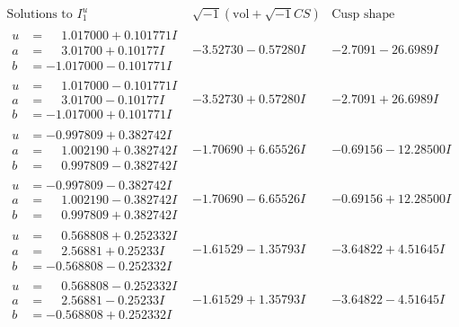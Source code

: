 \documentclass[1p]{elsarticle_modified}
\theoremstyle{definition}
\newcommand{\I}{\sqrt{-1}}
\begin{document}
$$\begin{array}{c|c|c}  
\text{Solutions to }I^u_{1}& \I (\text{vol} + \sqrt{-1}CS) & \text{Cusp shape}\\
 \hline 
\begin{aligned}
u &= \phantom{-}1.017000 + 0.101771 I \\
a &= \phantom{-}3.01700 + 0.10177 I \\
b &= -1.017000 - 0.101771 I\end{aligned}
 & -3.52730 - 0.57280 I & -2.7091 - 26.6989 I \\ \hline\begin{aligned}
u &= \phantom{-}1.017000 - 0.101771 I \\
a &= \phantom{-}3.01700 - 0.10177 I \\
b &= -1.017000 + 0.101771 I\end{aligned}
 & -3.52730 + 0.57280 I & -2.7091 + 26.6989 I \\ \hline\begin{aligned}
u &= -0.997809 + 0.382742 I \\
a &= \phantom{-}1.002190 + 0.382742 I \\
b &= \phantom{-}0.997809 - 0.382742 I\end{aligned}
 & -1.70690 + 6.65526 I & -0.69156 - 12.28500 I \\ \hline\begin{aligned}
u &= -0.997809 - 0.382742 I \\
a &= \phantom{-}1.002190 - 0.382742 I \\
b &= \phantom{-}0.997809 + 0.382742 I\end{aligned}
 & -1.70690 - 6.65526 I & -0.69156 + 12.28500 I \\ \hline\begin{aligned}
u &= \phantom{-}0.568808 + 0.252332 I \\
a &= \phantom{-}2.56881 + 0.25233 I \\
b &= -0.568808 - 0.252332 I\end{aligned}
 & -1.61529 - 1.35793 I & -3.64822 + 4.51645 I \\ \hline\begin{aligned}
u &= \phantom{-}0.568808 - 0.252332 I \\
a &= \phantom{-}2.56881 - 0.25233 I \\
b &= -0.568808 + 0.252332 I\end{aligned}
 & -1.61529 + 1.35793 I & -3.64822 - 4.51645 I \\ \hline\begin{aligned}

\end{aligned}
\end{array}$$
\end{document}
